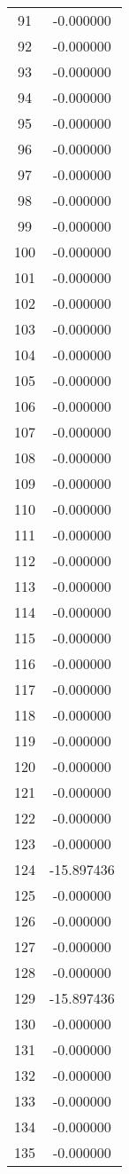 \documentclass[12pt]{article}
\begin{document}
\begin{longtable}{@{}cc@{}}
91 & -0.000000 \\
92 & -0.000000 \\
93 & -0.000000 \\
94 & -0.000000 \\
95 & -0.000000 \\
96 & -0.000000 \\
97 & -0.000000 \\
98 & -0.000000 \\
99 & -0.000000 \\
100 & -0.000000 \\
101 & -0.000000 \\
102 & -0.000000 \\
103 & -0.000000 \\
104 & -0.000000 \\
105 & -0.000000 \\
106 & -0.000000 \\
107 & -0.000000 \\
108 & -0.000000 \\
109 & -0.000000 \\
110 & -0.000000 \\
111 & -0.000000 \\
112 & -0.000000 \\
113 & -0.000000 \\
114 & -0.000000 \\
115 & -0.000000 \\
116 & -0.000000 \\
117 & -0.000000 \\
118 & -0.000000 \\
119 & -0.000000 \\
120 & -0.000000 \\
121 & -0.000000 \\
122 & -0.000000 \\
123 & -0.000000 \\
124 & -15.897436 \\
125 & -0.000000 \\
126 & -0.000000 \\
127 & -0.000000 \\
128 & -0.000000 \\
129 & -15.897436 \\
130 & -0.000000 \\
131 & -0.000000 \\
132 & -0.000000 \\
133 & -0.000000 \\
134 & -0.000000 \\
135 & -0.000000 \\

\end{longtable}
\end{document}
